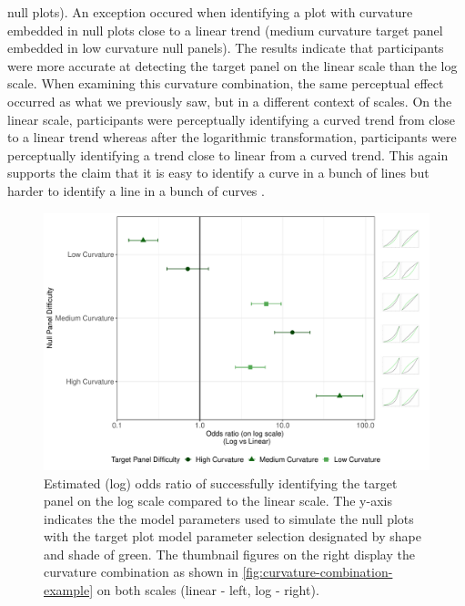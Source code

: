 \documentclass[12pt]{article}
\begin{document}
null plots). An exception occured when identifying a plot with curvature
embedded in null plots close to a linear trend (medium curvature target
panel embedded in low curvature null panels). The results indicate that
participants were more accurate at detecting the target panel on the
linear scale than the log scale. When examining this curvature
combination, the same perceptual effect occurred as what we previously
saw, but in a different context of scales. On the linear scale,
participants were perceptually identifying a curved trend from close to
a linear trend whereas after the logarithmic transformation,
participants were perceptually identifying a trend close to linear from
a curved trend. This again supports the claim that it is easy to
identify a curve in a bunch of lines but harder to identify a line in a
bunch of curves \citep{best_perception_2007}.

\begin{figure}[tbp]

{\centering \includegraphics[width=\linewidth,]{logarithmic-lineups_files/figure-latex/odds-ratio-plot-1} 

}

\caption[Lineups log(odds) results]{Estimated (log) odds ratio of successfully identifying the target panel on the log scale compared to the linear scale. The y-axis indicates the the model parameters used to simulate the null plots with the target plot model parameter selection designated by shape and shade of green. The thumbnail figures on the right display the curvature combination as shown in \cref{fig:curvature-combination-example} on both scales (linear - left, log - right).}\label{fig:odds-ratio-plot}
\end{figure}
\end{document}
